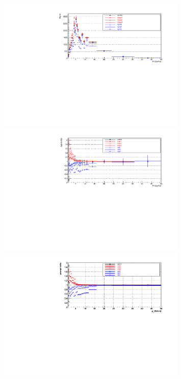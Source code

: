 \begin{figure}[tb]
\begin{center}
\includegraphics[width=0.8\textwidth]{figures/Dstar/pp13TeV/signal-cut-variation.pdf}
 \includegraphics[width=0.8\textwidth]{figures/Dstar/pp13TeV/signal-ratio-cut-variation.pdf}
 \includegraphics[width=0.8\textwidth]{figures/Dstar/pp13TeV/prompt-ratio-cut-variation.pdf} %

\end{center}
\end{figure}

